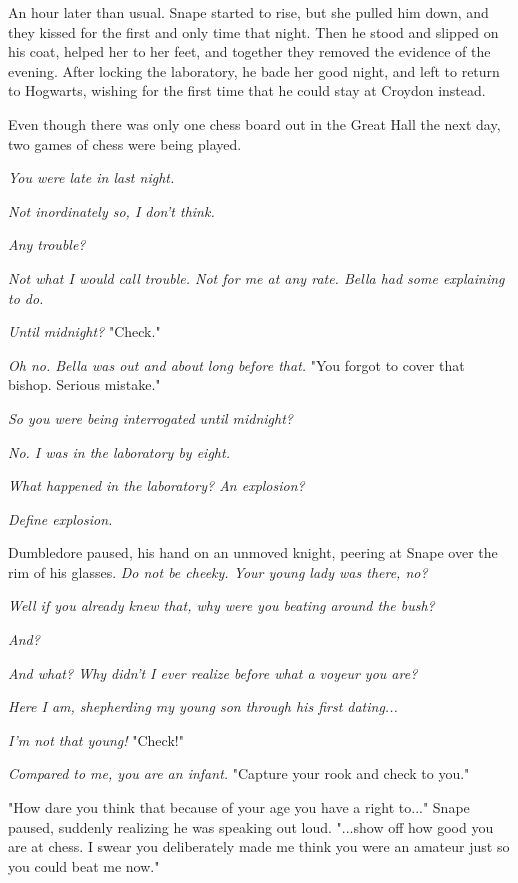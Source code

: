 An hour later than usual. Snape started to rise, but she pulled him down, and they kissed for the first and only time that night. Then he stood and slipped on his coat, helped her to her feet, and together they removed the evidence of the evening. After locking the laboratory, he bade her good night, and left to return to Hogwarts, wishing for the first time that he could stay at Croydon instead.

Even though there was only one chess board out in the Great Hall the next day, two games of chess were being played.

\emph{You were late in last night.}

\emph{Not inordinately so, I don't think.}

\emph{Any trouble?}

\emph{Not what I would call trouble. Not for me at any rate. Bella had some explaining to do.}

\emph{Until midnight?} "Check."

\emph{Oh no. Bella was out and about long before that.} "You forgot to cover that bishop. Serious mistake."

\emph{So you were being interrogated until midnight?}

\emph{No. I was in the laboratory by eight.}

\emph{What happened in the laboratory? An explosion?}

\emph{Define explosion.}

Dumbledore paused, his hand on an unmoved knight, peering at Snape over the rim of his glasses. \emph{Do not be cheeky. Your young lady was there, no?}

\emph{Well if you already knew that, why were you beating around the bush?}

\emph{And?}

\emph{And what? Why didn't I ever realize before what a voyeur you are?}

\emph{Here I am, shepherding my young son through his first dating...}

\emph{I'm not that young!} "Check!"

\emph{Compared to me, you are an infant.} "Capture your rook and check to you."

"How dare you think that because of your age you have a right to..." Snape paused, suddenly realizing he was speaking out loud. "...show off how good you are at chess. I swear you deliberately made me think you were an amateur just so you could beat me now."

